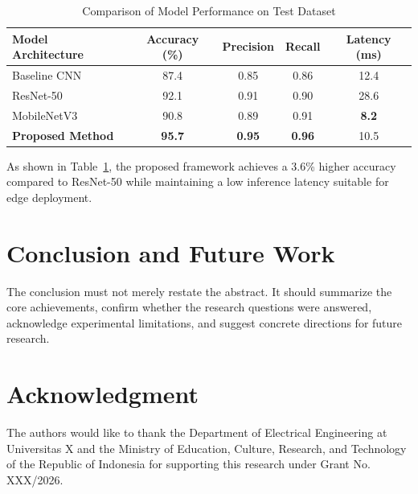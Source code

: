 \documentclass[conference]{IEEEtran}
\begin{document}
\begin{table}[htbp]
\caption{Comparison of Model Performance on Test Dataset}
\begin{center}
\begin{tabular}{lcccc}
\toprule
\textbf{Model Architecture} & \textbf{Accuracy (\%)} & \textbf{Precision} & \textbf{Recall} & \textbf{Latency (ms)} \\
\midrule
Baseline CNN & 87.4 & 0.85 & 0.86 & 12.4 \\
ResNet-50 & 92.1 & 0.91 & 0.90 & 28.6 \\
MobileNetV3 & 90.8 & 0.89 & 0.91 & \textbf{8.2} \\
\textbf{Proposed Method} & \textbf{95.7} & \textbf{0.95} & \textbf{0.96} & 10.5 \\
\bottomrule
\end{tabular}
\label{tab:performance}
\end{center}
\end{table}

As shown in Table~\ref{tab:performance}, the proposed framework achieves a 3.6\% higher accuracy compared to ResNet-50 while maintaining a low inference latency suitable for edge deployment.

\section{Conclusion and Future Work}
\label{sec:conclusion}
The conclusion must not merely restate the abstract. It should summarize the core achievements, confirm whether the research questions were answered, acknowledge experimental limitations, and suggest concrete directions for future research.

\section*{Acknowledgment}
The authors would like to thank the Department of Electrical Engineering at Universitas X and the Ministry of Education, Culture, Research, and Technology of the Republic of Indonesia for supporting this research under Grant No. XXX/2026.



\end{document}
